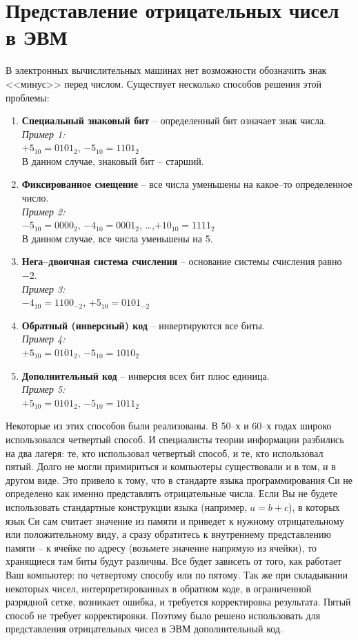 \section{Представление отрицательных чисел в ЭВМ}

В электронных вычислительных машинах нет возможности обозначить знак <<минус>> перед числом. Существует несколько способов решения этой проблемы:
\begin{enumerate}
\item \textbf{Специальный знаковый бит} -- определенный бит означает знак числа.
\\\emph{Пример 1:}
\\$+5_{10} = 0101_{2}$, $-5_{10} = 1101_{2}$
\\В данном случае, знаковый бит -- старший.
\item \textbf{Фиксированное смещение} -- все числа уменьшены на какое--то определенное число.
\\\emph{Пример 2:}
\\$-5_{10} = 0000_{2}$, $-4_{10} = 0001_{2}$, \dots ,$+10_{10} = 1111_{2}$
\\В данном случае, все числа уменьшены на 5.
\item \textbf{Нега--двоичная система счисления} -- основание системы счисления равно $-2$.
\\\emph{Пример 3:}
\\$-4_{10} = 1100_{-2}$, $+5_{10} = 0101_{-2}$
\item \textbf{Обратный (инверсный) код} -- инвертируются все биты.
\\\emph{Пример 4:}
\\$+5_{10} = 0101_{2}$, $-5_{10} = 1010_{2}$
\item \textbf{Дополнительный код} -- инверсия всех бит плюс единица.
\\\emph{Пример 5:}
\\$+5_{10} = 0101_{2}$, $-5_{10} = 1011_{2}$
\end{enumerate}

Некоторые из этих способов были реализованы. В 50--х и 60--х годах широко использовался четвертый способ. И специалисты теории информации разбились на два лагеря: те, кто использовал четвертый способ, и те, кто использовал пятый. Долго не могли примириться и компьютеры существовали и в том, и в другом виде. Это привело к тому, что в стандарте языка программирования Си не определено как именно представлять отрицательные числа. Если Вы не будете использовать стандартные конструкции языка (например, $a = b + c$), в которых язык Си сам считает значение из памяти и приведет к нужному отрицательному или положительному виду, а сразу обратитесь к внутреннему представлению памяти -- к ячейке по адресу (возьмете значение напрямую из ячейки), то хранящиеся там биты будут различны. Все будет зависеть от того, как работает Ваш компьютер: по четвертому способу или по пятому. Так же при складывании некоторых чисел, интерпретированных в обратном коде, в ограниченной разрядной сетке, возникает ошибка, и требуется корректировка результата. Пятый способ не требует корректировки. Поэтому было решено использовать для представления отрицательных чисел в ЭВМ дополнительный код.

